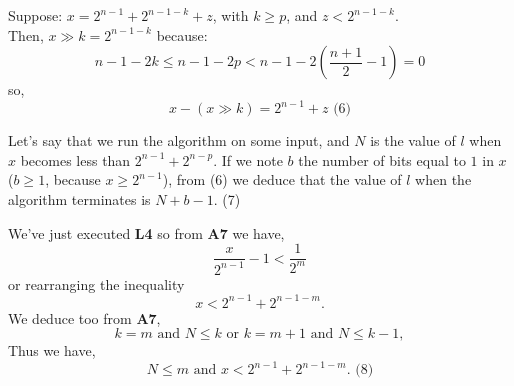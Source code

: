 \documentclass[a4paper,12pt]{article}
\begin{document}
Suppose: $x = 2^{n-1} + 2^{n-1-k} + z$, with $k \ge p$, and $z < 2^{n-1-k}$.\\
Then, $x \gg k = 2^{n-1-k}$ because:
\[n-1-2k \le n-1-2p < n- 1 - 2(\frac{n+1}{2} - 1) = 0\] so,
\[x - (x \gg k) = 2^{n-1} + z \mbox{ (6)}\]

Let's say that we run the algorithm on some input, and $N$ is the value of
$l$ when $x$ becomes less than $2^{n-1} + 2^{n-p}$.  If we note $b$ the
number of bits equal to $1$ in $x$ ($b \ge 1$, because $x \ge 2^{n-1}$), from
(6) we deduce that the value of $l$ when the algorithm terminates is
$N + b - 1$. (7)

We've just executed \textbf{L4} so from 
\textbf{A7} we have,
\[\frac{x}{2^{n-1}} - 1 < \frac{1}{2^m}\]
or rearranging the inequality
\[x < 2^{n-1} + 2^{n-1-m}.\]
 We deduce too from \textbf{A7},
\[k = m \mbox{ and } N \le k \mbox{ or } k = m+1 \mbox{ and } N \le k-1,\]
Thus we have,
\[N \le m \mbox{ and } x < 2^{n-1} + 2^{n-1-m}. \mbox{ (8)}\]
\end{document}
